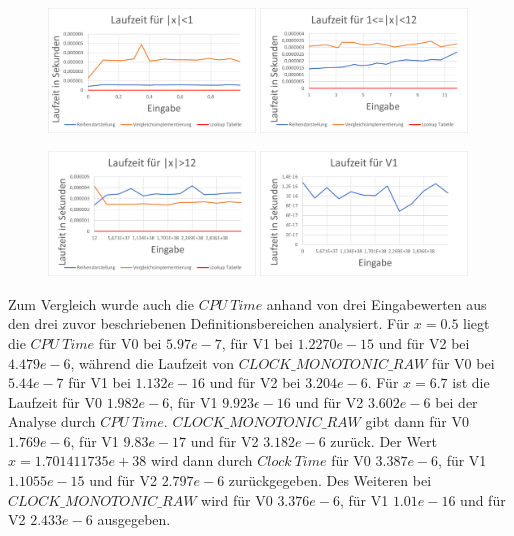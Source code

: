 \documentclass[course=erap]{aspdoc}
\begin{document}
\begin{figure}

\includegraphics[width=0.49\textwidth]{newnewLaufzeit1.png}
\includegraphics[width=0.49\textwidth]{newnewLaufzeit2.png}
\end{figure}

\begin{figure}
\includegraphics[width=0.49\textwidth]{Laufzeitnewnew3.png}
\includegraphics[width=0.49\textwidth]{Laufzeitlookup.png}
\end{figure}

Zum Vergleich wurde auch die $CPU \ Time$ anhand von drei Eingabewerten aus den drei zuvor beschriebenen Definitionsbereichen analysiert. 
Für $x=0.5$ liegt die $CPU \ Time$ für V0 bei $5.97e-7$, für V1 bei $1.2270e-15$ und für V2 bei $4.479e-6$, während die Laufzeit von $CLOCK\_MONOTONIC\_RAW$ für V0 bei $5.44e-7$ für V1 bei $1.132e-16$ und für V2 bei $3.204e-6$.
Für $x=6.7$ ist die Laufzeit für V0 $1.982e-6$, für V1 $9.923\epsilon-16$ und für V2 $3.602e-6$ bei der Analyse durch $CPU \ Time$. $CLOCK\_MONOTONIC\_RAW$ gibt dann für V0 $1.769e-6$, für V1 $9.83e-17$ und für V2 $3.182e-6$ zurück. Der Wert $x=1.701411735e+38$ wird dann durch $Clock \ Time$ für V0 $3.387e-6$, für V1 $1.1055e-15$ und für V2 $2.797e-6$ zurückgegeben. Des Weiteren bei  $CLOCK\_MONOTONIC\_RAW$ wird für V0 $3.376e-6$, für V1 $1.01e-16$ und für V2 $2.433e-6$ ausgegeben.
\end{document}
